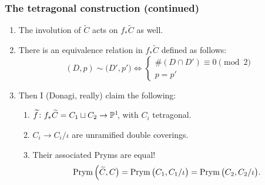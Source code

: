 \begin{frame}
\frametitle{The tetragonal construction (continued)}

\begin{enumerate}[<+->]
	\item The involution of $\widetilde C$ acts on $f_\ast \widetilde C$ as well.

	\item There is an equivalence relation in $f_\ast \widetilde C$ defined as follows:
	\[
	(D,p) \sim \big(D',p'\big) \iff
	\begin{cases}
	\#(D \cap D') \equiv 0 \pmod 2 \\
	p = p'
	\end{cases}
	\]

	\item Then I (Donagi, really) claim the following:
	\begin{enumerate}
		\item $\widetilde f\colon f_\ast \widetilde C = C_1 \sqcup C_2 \to \P^1\mkern-4mu$, with $C_i$ tetragonal.
		\item $C_i \to C_i/\iota$ are unramified double coverings.
		\item Their associated Pryms are equal!
		\[
		\Prym\Big(\widetilde C, C\big)=\Prym\big(C_1,C_1/\iota\big)=\Prym\big(C_2,C_2/\iota\big).
		\]
	\end{enumerate}
\end{enumerate}



\end{frame}
